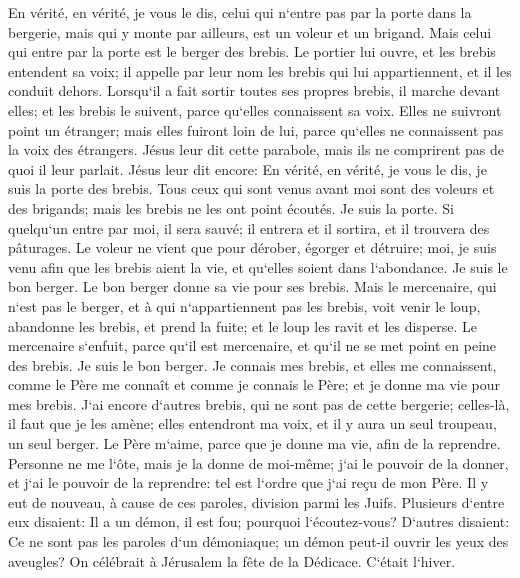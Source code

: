 \verse En vérité, en vérité, je vous le dis, celui qui n`entre pas par la porte dans la bergerie, mais qui y monte par ailleurs, est un voleur et un brigand. 
\verse Mais celui qui entre par la porte est le berger des brebis. 
\verse Le portier lui ouvre, et les brebis entendent sa voix; il appelle par leur nom les brebis qui lui appartiennent, et il les conduit dehors. 
\verse Lorsqu`il a fait sortir toutes ses propres brebis, il marche devant elles; et les brebis le suivent, parce qu`elles connaissent sa voix. 
\verse Elles ne suivront point un étranger; mais elles fuiront loin de lui, parce qu`elles ne connaissent pas la voix des étrangers. 
\verse Jésus leur dit cette parabole, mais ils ne comprirent pas de quoi il leur parlait. 
\verse Jésus leur dit encore: En vérité, en vérité, je vous le dis, je suis la porte des brebis. 
\verse Tous ceux qui sont venus avant moi sont des voleurs et des brigands; mais les brebis ne les ont point écoutés. 
\verse Je suis la porte. Si quelqu`un entre par moi, il sera sauvé; il entrera et il sortira, et il trouvera des pâturages. 
\verse Le voleur ne vient que pour dérober, égorger et détruire; moi, je suis venu afin que les brebis aient la vie, et qu`elles soient dans l`abondance. 
\verse Je suis le bon berger. Le bon berger donne sa vie pour ses brebis. 
\verse Mais le mercenaire, qui n`est pas le berger, et à qui n`appartiennent pas les brebis, voit venir le loup, abandonne les brebis, et prend la fuite; et le loup les ravit et les disperse. 
\verse Le mercenaire s`enfuit, parce qu`il est mercenaire, et qu`il ne se met point en peine des brebis. Je suis le bon berger. 
\verse Je connais mes brebis, et elles me connaissent, 
\verse comme le Père me connaît et comme je connais le Père; et je donne ma vie pour mes brebis. 
\verse J`ai encore d`autres brebis, qui ne sont pas de cette bergerie; celles-là, il faut que je les amène; elles entendront ma voix, et il y aura un seul troupeau, un seul berger. 
\verse Le Père m`aime, parce que je donne ma vie, afin de la reprendre. 
\verse Personne ne me l`ôte, mais je la donne de moi-même; j`ai le pouvoir de la donner, et j`ai le pouvoir de la reprendre: tel est l`ordre que j`ai reçu de mon Père. 
\verse Il y eut de nouveau, à cause de ces paroles, division parmi les Juifs. 
\verse Plusieurs d`entre eux disaient: Il a un démon, il est fou; pourquoi l`écoutez-vous? 
\verse D`autres disaient: Ce ne sont pas les paroles d`un démoniaque; un démon peut-il ouvrir les yeux des aveugles? 
\verse On célébrait à Jérusalem la fête de la Dédicace. C`était l`hiver. 
